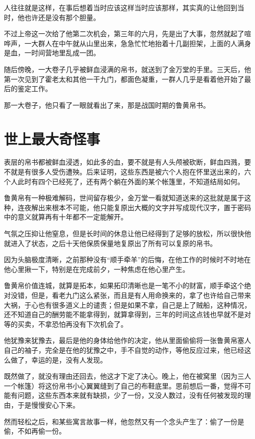 人往往就是这样，在事后想着当时应该这样当时应该那样，其实真的让他回到当时，他也许还是没有那个胆量。

不过上帝这一次给了他第二次机会，第三年的六月，先是出了大事，忽然就起了喧哗声，一大群人在中午就从山里出来，急急忙忙地抬着十几副担架，上面的人满身是血，一时间营地里乱成一团。

随后傍晚，一大卷子几乎被鲜血浸满的帛书，就送到了金万堂的手里。三天后，他第一次见到了霍老太和其他一干九门，都面色凝重，一群人几乎是看着他开始了最后的鉴定工作。

那一大卷子，他只看了一眼就看出了来，那是战国时期的鲁黄帛书。

\chapter{世上最大奇怪事}

表层的帛书都被鲜血浸透，如此多的血，要不就是有人头颅被砍断，鲜血四溅，要不就是有很多人受伤遭殃。后来证明，这些东西是被六个人抱在怀里送出来的，六个人此时有四个已经死了，还有两个躺在外面的某个帐篷里，不知道结局如何。

鲁黄帛有一种极难解码，世间留存极少，金万堂一看就知道送来的这批就是属于这种，连夜解出来根本不可能，他只能复原出大概的文字并写成现代汉字，置于密码中的意义就算再有十年都不一定能解开。

气氛之压抑让他窒息，但是长时间的休息让他已经得到了足够的放松，所以很快他就进入了状态，之后十天他保质保量地复原出了所有可以复原的帛书。

因为头脑极度清晰，之前那种没有“顺手牵羊”的后悔，在他工作的时候时不时地在他心里揪一下，特别是在完成前夕，一种焦虑在他心里产生。

鲁黄帛价值连城，就算是拓本，如果拓印清晰也是一笔不小的财富，顺手牵这个绝对没错，但是，看老九门这么紧张，而且是有人用命换来的，拿了也许给自己带来大祸，于心也有很多道义上的谴责；但是如果不拿，自己是上了贼船，这种情况，还不知道自己的酬劳能不能拿得到，就算拿得到，三年的时间这点钱也早就不是对等的买卖，不拿恐怕再没有下次机会了。

他犹豫来犹豫去，最后是他的身体给他作的决定，他从里面偷偷将一张鲁黄帛塞人自己的袖子，完全是在他的犹豫之中，手不自觉的动作，等他反应过来，他已经这么做了，幸运的是，没有人发现。

既然做了，就没有理由还回去，他这才下定了决心。晚上，他在被窝里（因为三人一个帐篷）将这份帛书小心翼翼缝到了自己的布鞋底里。思前想后一番，觉得不可能有问题，这些东西本来就有缺损，少了一份，又没人数过，没有任何被发现的理由，于是慢慢安心下来。

然而轻松之后，和某些寓言故事一样，他忽然又有一个念头产生了：偷了一份是偷，不如再偷一份。

